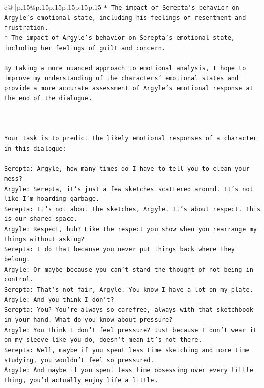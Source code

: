 \documentclass{article}
\begin{document}
{\begin{supertabular}{c@{$\;$}|p{.15\linewidth}@{}p{.15\linewidth}p{.15\linewidth}p{.15\linewidth}p{.15\linewidth}p{.15\linewidth}}
{{{\texttt{* The impact of Serepta's behavior on Argyle's emotional state, including his feelings of resentment and frustration.} \\
\texttt{* The impact of Argyle's behavior on Serepta's emotional state, including her feelings of guilt and concern.} \\
\\ 
\texttt{By taking a more nuanced approach to emotional analysis, I hope to improve my understanding of the characters' emotional states and provide a more accurate assessment of Argyle's emotional response at the end of the dialogue.} \\
\\ 
\\ 
\\ 
\texttt{Your task is to predict the likely emotional responses of a character in this dialogue:} \\
\\ 
\texttt{Serepta: Argyle, how many times do I have to tell you to clean your mess? } \\
\texttt{Argyle: Serepta, it's just a few sketches scattered around. It's not like I'm hoarding garbage.} \\
\texttt{Serepta: It's not about the sketches, Argyle. It's about respect. This is our shared space.} \\
\texttt{Argyle: Respect, huh? Like the respect you show when you rearrange my things without asking?} \\
\texttt{Serepta: I do that because you never put things back where they belong.} \\
\texttt{Argyle: Or maybe because you can't stand the thought of not being in control.} \\
\texttt{Serepta: That's not fair, Argyle. You know I have a lot on my plate.} \\
\texttt{Argyle: And you think I don't? } \\
\texttt{Serepta: You? You're always so carefree, always with that sketchbook in your hand. What do you know about pressure?} \\
\texttt{Argyle: You think I don't feel pressure? Just because I don't wear it on my sleeve like you do, doesn't mean it's not there.} \\
\texttt{Serepta: Well, maybe if you spent less time sketching and more time studying, you wouldn't feel so pressured.} \\
\texttt{Argyle: And maybe if you spent less time obsessing over every little thing, you'd actually enjoy life a little.} \\
}}}
\end{supertabular}}
\end{document}
